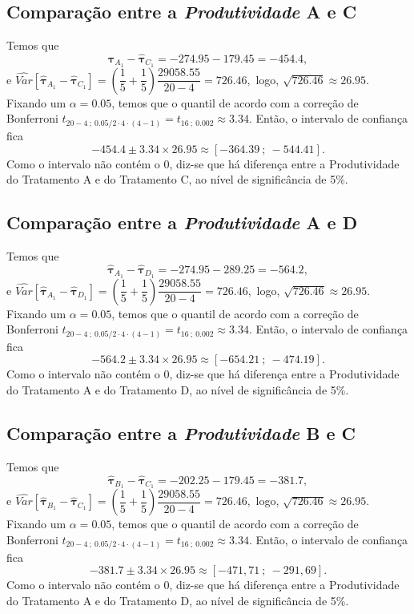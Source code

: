 \subsection*{Comparação entre a \textit{Produtividade} A e C}

Temos que $$\boldsymbol{\widehat{\tau}}_{A_{1}} - \boldsymbol{\widehat{\tau}}_{C_{1}} = -274.95 - 179.45 = -454.4,$$ e $\widehat{Var}\left[\boldsymbol{\widehat{\tau}}_{A_{1}} - \boldsymbol{\widehat{\tau}}_{C_{1}}\right] = \left( \dfrac{1}{5} + \dfrac{1}{5} \right) \dfrac{29058.55}{20 - 4} = 726.46,$ logo, $\sqrt{726.46} \approx 26.95$. Fixando um $\alpha = 0.05$, temos que o quantil de acordo com a correção de Bonferroni $t_{20-4 \ ; \ 0.05/2 \cdot 4 \cdot (4-1)} = t_{16 \ ; \ 0.002} \approx 3.34$. Então, o intervalo de confiança fica $$-454.4 \pm 3.34 \times 26.95 \approx [-364.39 \ ; \ -544.41].$$ Como o intervalo não contém o $0$, diz-se que há diferença entre a Produtividade do Tratamento A e do Tratamento C, ao nível de significância de 5\%.

\subsection*{Comparação entre a \textit{Produtividade} A e D}

Temos que $$\boldsymbol{\widehat{\tau}}_{A_{1}} - \boldsymbol{\widehat{\tau}}_{D_{1}} = -274.95 - 289.25 = -564.2,$$ e $\widehat{Var}\left[\boldsymbol{\widehat{\tau}}_{A_{1}} - \boldsymbol{\widehat{\tau}}_{D_{1}}\right] = \left( \dfrac{1}{5} + \dfrac{1}{5} \right) \dfrac{29058.55}{20 - 4} = 726.46,$ logo, $\sqrt{726.46} \approx 26.95$. Fixando um $\alpha = 0.05$, temos que o quantil de acordo com a correção de Bonferroni $t_{20-4 \ ; \ 0.05/2 \cdot 4 \cdot (4-1)} = t_{16 \ ; \ 0.002} \approx 3.34$. Então, o intervalo de confiança fica $$-564.2 \pm 3.34 \times 26.95 \approx [-654.21 \ ; \ -474.19].$$ Como o intervalo não contém o $0$, diz-se que há diferença entre a Produtividade do Tratamento A e do Tratamento D, ao nível de significância de 5\%.

\subsection*{Comparação entre a \textit{Produtividade} B e C}

Temos que $$\boldsymbol{\widehat{\tau}}_{B_{1}} - \boldsymbol{\widehat{\tau}}_{C_{1}} = -202.25 - 179.45 = -381.7,$$ e $\widehat{Var}\left[\boldsymbol{\widehat{\tau}}_{B_{1}} - \boldsymbol{\widehat{\tau}}_{C_{1}}\right] = \left( \dfrac{1}{5} + \dfrac{1}{5} \right) \dfrac{29058.55}{20 - 4} = 726.46,$ logo, $\sqrt{726.46} \approx 26.95$. Fixando um $\alpha = 0.05$, temos que o quantil de acordo com a correção de Bonferroni $t_{20-4 \ ; \ 0.05/2 \cdot 4 \cdot (4-1)} = t_{16 \ ; \ 0.002} \approx 3.34$. Então, o intervalo de confiança fica $$-381.7 \pm 3.34 \times 26.95 \approx [-471,71 \ ; \ -291,69].$$ Como o intervalo não contém o $0$, diz-se que há diferença entre a Produtividade do Tratamento A e do Tratamento D, ao nível de significância de 5\%.


